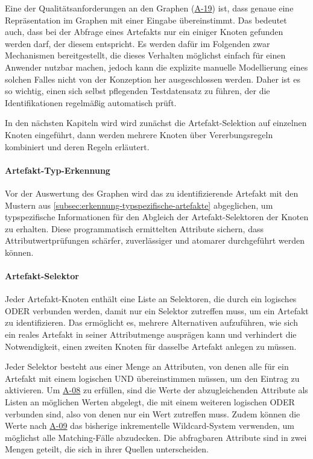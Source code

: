 Eine der Qualitätsanforderungen an den Graphen (\hyperref[subsec:req-graph-inner-consistency]{A-19}) ist, dass genaue eine Repräsentation im Graphen mit einer Eingabe übereinstimmt.
Das bedeutet auch, dass bei der Abfrage eines Artefakts nur ein einiger Knoten gefunden werden darf, der diesem entspricht.
Es werden dafür im Folgenden zwar Mechanismen bereitgestellt, die dieses Verhalten möglichst einfach für einen Anwender nutzbar machen, jedoch kann die explizite manuelle Modellierung eines solchen Falles nicht von der Konzeption her ausgeschlossen werden.
Daher ist es so wichtig, einen sich selbst pflegenden Testdatensatz zu führen, der die Identifikationen regelmäßig automatisch prüft.

In den nächsten Kapiteln wird wird zunächst die Artefakt-Selektion auf einzelnen Knoten eingeführt, dann werden mehrere Knoten über Vererbungsregeln kombiniert und deren Regeln erläutert.

\paragraph{Artefakt-Typ-Erkennung}

Vor der Auswertung des Graphen wird das zu identifizierende Artefakt mit den Mustern aus \autoref{subsec:erkennung-typspezifische-artefakte} abgeglichen, um typspezifische Informationen für den Abgleich der Artefakt-Selektoren der Knoten zu erhalten.
Diese programmatisch ermittelten Attribute sichern, dass Attributwertprüfungen schärfer, zuverlässiger und atomarer durchgeführt werden können.

\paragraph{Artefakt-Selektor}

Jeder Artefakt-Knoten enthält eine Liste an Selektoren, die durch ein logisches ODER verbunden werden, damit nur ein Selektor zutreffen muss, um ein Artefakt zu identifizieren.
Das ermöglicht es, mehrere Alternativen aufzuführen, wie sich ein reales Artefakt in seiner Attributmenge ausprägen kann und verhindert die Notwendigkeit, einen zweiten Knoten für dasselbe Artefakt anlegen zu müssen.

Jeder Selektor besteht aus einer Menge an Attributen, von denen alle für ein Artefakt mit einem logischen UND übereinstimmen müssen, um den Eintrag zu aktivieren.
Um \hyperref[subsec:req-multiple-attribute-values]{A-08} zu erfüllen, sind die Werte der abzugleichenden Attribute als Listen an möglichen Werten abgelegt, die mit einem weiteren logischen ODER verbunden sind, also von denen nur ein Wert zutreffen muss.
Zudem können die Werte nach \hyperref[subsec:req-regex-support]{A-09} das bisherige inkrementelle Wildcard-System verwenden, um möglichst alle Matching-Fälle abzudecken.
Die abfragbaren Attribute sind in zwei Mengen geteilt, die sich in ihrer Quellen unterscheiden.

